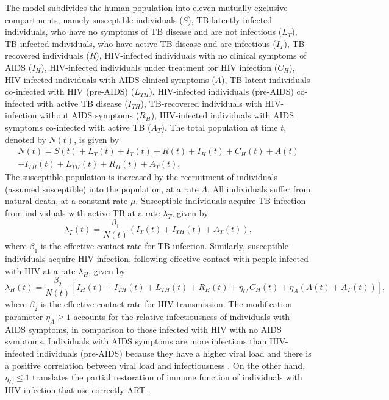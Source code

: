 \documentclass{my_aims}
\theoremstyle{definition}
\begin{document}
The model subdivides the human population into eleven mutually-exclusive compartments,
namely susceptible individuals ($S$), TB-latently infected individuals, who have
no symptoms of TB disease and are not infectious ($L_T$), TB-infected individuals,
who have active TB disease and are infectious ($I_T$), TB-recovered individuals
($R$), HIV-infected individuals with no clinical symptoms of AIDS ($I_H$),
HIV-infected individuals under treatment for HIV infection ($C_H$),
HIV-infected individuals with AIDS clinical symptoms ($A$), TB-latent individuals
co-infected with HIV (pre-AIDS) ($L_{TH}$), HIV-infected individuals (pre-AIDS)
co-infected with active TB disease ($I_{TH}$), TB-recovered individuals with
HIV-infection without AIDS symptoms ($R_{H}$), HIV-infected individuals
with AIDS symptoms co-infected with active TB ($A_T$).
The total population at time $t$, denoted by $N(t)$, is given by
\begin{multline*}
N(t) = S(t) + L_T(t) + I_T(t) + R(t) + I_H(t) + C_H(t) + A(t)\\
+ I_{TH}(t) + L_{TH}(t) + R_{H}(t) + A_T(t).
\end{multline*}
The susceptible population is increased by the recruitment of individuals
(assumed susceptible) into the population, at a rate $\Lambda$.
All individuals suffer from natural death, at a constant rate $\mu$.
Susceptible individuals acquire TB infection from individuals
with active TB at a rate $\lambda_T$, given by
\begin{equation}
\label{eq:lambdaT}
\lambda_T(t) = \frac{\beta_1}{N(t)} \left(I_T(t) + I_{TH}(t) + A_T(t)\right),
\end{equation}
where $\beta_1$ is the effective contact rate for TB infection.
Similarly, susceptible individuals acquire HIV infection, following
effective contact with people infected with HIV at a rate $\lambda_H$, given by
\begin{equation}
\label{eq:lambdaH}
\lambda_H(t) = \frac{\beta_2}{N(t)} \left[ I_H(t) + I_{TH}(t) + L_{TH}(t)
+ R_{H}(t) + \eta_C \, C_H(t)  + \eta_A \left(A(t) + A_T(t)\right) \right],
\end{equation}
where $\beta_2$ is the effective contact rate for HIV transmission.
The modification parameter $\eta_A \geq 1$ accounts for the relative
infectiousness of individuals with AIDS symptoms, in comparison to those
infected with HIV with no AIDS symptoms. Individuals with AIDS symptoms
are more infectious than HIV-infected individuals (pre-AIDS) because
they have a higher viral load and there is a positive correlation
between viral load and infectiousness \cite{art:viral:load}.
On the other hand, $\eta_C \leq 1$ translates the partial restoration of immune function
of individuals with HIV infection that use correctly ART \cite{AIDS:chronic:Lancet:2013}.
\end{document}
